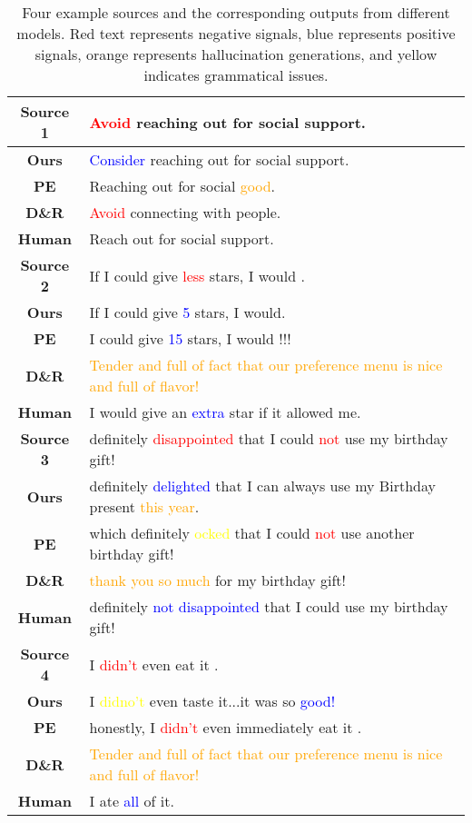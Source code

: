 \documentclass{article}
\begin{document}
\begin{table*}[ht]
\centering
\begin{small}
\begin{tabular}{c|l}
\hline
\textbf{Source 1} & \textcolor{red}{Avoid} reaching out for social support.\\
\hline
\textbf{Ours} & \textcolor{blue}{Consider} reaching out for social support.\\
\textbf{PE} & Reaching out for social \textcolor{orange}{good}.\\
\textbf{D\&R} & \textcolor{red}{Avoid} connecting with people.\\
\textbf{Human} & Reach out for social support.\\
\hline
\textbf{Source 2} & If I could give \textcolor{red}{less} stars, I would .\\
\hline
\textbf{Ours} & If I could give \textcolor{blue}{5} stars, I would.\\
\textbf{PE} & I could give \textcolor{blue}{15} stars, I would !!!\\
\textbf{D\&R} & \textcolor{orange}{Tender and full of fact that our preference menu is nice and full of flavor!}\\
\textbf{Human} & I would give an \textcolor{blue}{extra} star if it allowed me.\\
\hline

\textbf{Source 3} & definitely \textcolor{red}{disappointed} that I could \textcolor{red}{ not} use my birthday gift! \\
\hline
\textbf{Ours} & definitely \textcolor{blue}{delighted} that I can always use my Birthday present \textcolor{orange}{this year}.\\
\textbf{PE} & which definitely \textcolor{yellow}{ocked} that I could \textcolor{red}{not} use another birthday gift!\\
\textbf{D\&R} & \textcolor{orange}{thank you so much} for my birthday gift!\\
\textbf{Human} & definitely \textcolor{blue}{not disappointed} that I could use my birthday gift!\\
\hline

\textbf{Source 4} & I \textcolor{red}{didn't} even eat it . \\
\hline
\textbf{Ours} & I \textcolor{yellow}{didno't} even taste it...it was so \textcolor{blue}{good!}\\
\textbf{PE} & honestly, I \textcolor{red}{didn't} even immediately eat it .\\
\textbf{D\&R} & \textcolor{orange}{Tender and full of fact that our preference menu is nice and full of flavor!}\\
\textbf{Human} & I ate \textcolor{blue}{all} of it.\\
\hline
\end{tabular}
\end{small}
\caption{\small Four example sources and the corresponding outputs from different models. Red text represents negative signals, blue represents positive signals, orange represents hallucination generations, and yellow indicates grammatical issues.}
\label{tab:case}
\end{table*}
\end{document}
